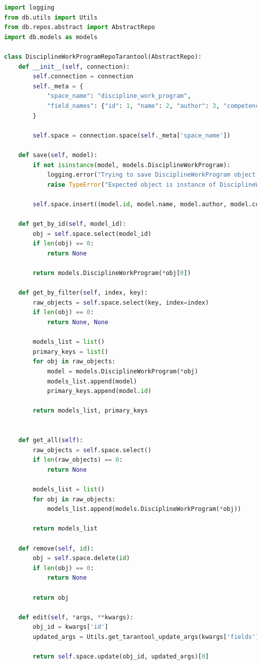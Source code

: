 \begin{lstlisting}[label=lst:db-tarantool, caption=Листинг модуля взаимодействия с СУБД Tarantool, language=python]
import logging
from db.utils import Utils
from db.repos.abstract import AbstractRepo
import db.models as models

class DisciplineWorkProgramRepoTarantool(AbstractRepo):
	def __init__(self, connection):
		self.connection = connection
		self._meta = {
			"space_name": "discipline_work_program",
			"field_names": {"id": 1, "name": 2, "author": 3, "competency": 4}
		}
		
		self.space = connection.space(self._meta['space_name'])
	
	def save(self, model):
		if not isinstance(model, models.DisciplineWorkProgram):
			logging.error("Trying to save DisciplineWorkProgram object of invalid type")
			raise TypeError("Expected object is instance of DisciplineWorkProgram")
		
		self.space.insert((model.id, model.name, model.author, model.competency))
	
	def get_by_id(self, model_id):
		obj = self.space.select(model_id)
		if len(obj) == 0:
			return None
		
		return models.DisciplineWorkProgram(*obj[0])
	
	def get_by_filter(self, index, key):
		raw_objects = self.space.select(key, index=index)
		if len(obj) == 0:
			return None, None
		
		models_list = list()
		primary_keys = list()
		for obj in raw_objects:
			model = models.DisciplineWorkProgram(*obj)
			models_list.append(model)
			primary_keys.append(model.id)
		
		return models_list, primary_keys
	
	
	def get_all(self):
		raw_objects = self.space.select()
		if len(raw_objects) == 0:
			return None
		
		models_list = list()
		for obj in raw_objects:
			models_list.append(models.DisciplineWorkProgram(*obj))
		
		return models_list
	
	def remove(self, id):
		obj = self.space.delete(id)
		if len(obj) == 0:
			return None
		
		return obj
	
	def edit(self, *args, **kwargs):
		obj_id = kwargs['id']
		updated_args = Utils.get_tarantool_update_args(kwargs['fields'], self._meta['field_names'])
		
		return self.space.update(obj_id, updated_args)[0]



\end{lstlisting}
